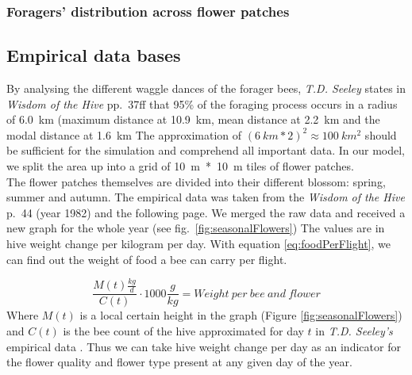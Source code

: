 		\subsubsection{Foragers' distribution across flower patches}
		
		
	\subsection{Empirical data bases}
		By analysing the different waggle dances of the forager bees, \textit{T.D. Seeley} states in \textit{Wisdom of the Hive} pp.~37ff that 95\% of the foraging process occurs in a radius of 6.0~km (maximum distance at 10.9~km, mean distance at 2.2~km and the modal distance at 1.6~km \cite{seeley95} The approximation of $(6~km * 2)^2 \approx 100~km^2$ should be sufficient for the simulation and comprehend all important data. In our model, we split the area up into a grid of 10~m~*~10~m tiles of flower patches. \\
		The flower patches themselves are divided into their different blossom: spring, summer and autumn. The empirical data was taken from the \textit{Wisdom of the Hive} p.~44 (year 1982) and the following page. We merged the raw data and received a new graph for the whole year (see fig.~\ref{fig:seasonalFlowers}) The values are in hive weight change per kilogram per day. With equation \ref{eq:foodPerFlight}, we can find out the weight of food a bee can carry per flight.
		
		\begin{equation}\label{eq:foodPerFlight}
					\frac{M(t) \frac{kg}{d}}{C(t)}\cdot 1000 \frac{g}{kg} = Weight~per~bee~and~flower
		\end{equation}
		Where $M(t)$ is a local certain height in the graph (Figure \ref{fig:seasonalFlowers}) and $C(t)$ is the bee count of the hive approximated for day $t$ in \textit{T.D. Seeley's} empirical data \cite{seeley95}. Thus we can take hive weight change per day as an indicator for the flower quality and flower type present at any given day of the year. 
		
